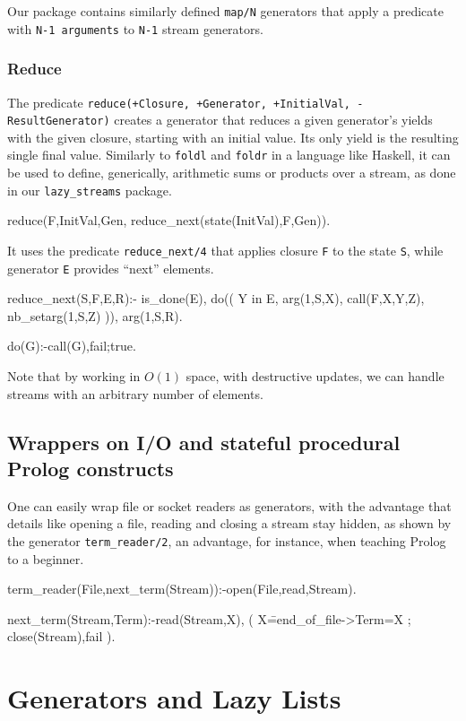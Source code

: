 \documentclass{new_tlp}
\begin{document}
Our package contains similarly defined {\tt map/N} generators that
apply a predicate with {\tt N-1 arguments} to
{\tt N-1} stream generators.

\subsubsection{Reduce}

The predicate {\tt reduce(+Closure, +Generator, +InitialVal, -ResultGenerator)}
creates a generator that reduces a given generator's yields with the given closure, 
starting with an initial value. Its only yield is the resulting single final value.
Similarly to {\tt foldl} and {\tt foldr} in a language like Haskell, it can be used to
define, generically, arithmetic sums or products over a stream,
as done in our {\tt lazy\_streams} package.

\begin{code}
reduce(F,InitVal,Gen, reduce_next(state(InitVal),F,Gen)).
\end{code}
It uses the predicate {\tt reduce\_next/4} 
that  applies closure {\tt F} to the state {\tt S}, 
while generator {\tt E} provides ``next'' elements.
\begin{code}
reduce_next(S,F,E,R):- \+ is_done(E),
  do((
    Y in E, arg(1,S,X),
    call(F,X,Y,Z),
    nb_setarg(1,S,Z)
  )),
  arg(1,S,R).

do(G):-call(G),fail;true.
\end{code}
Note that by working in $O(1)$ space, with destructive updates,
we can handle streams with an arbitrary number of elements.
\subsection{Wrappers on I/O and stateful procedural Prolog constructs}

One can easily wrap file or socket readers as generators, with the
advantage that details like opening a file, reading and
closing a stream stay hidden,  as shown by the generator
{\tt term\_reader/2}, an advantage, for instance, 
when teaching Prolog to a beginner.

\begin{code}
term_reader(File,next_term(Stream)):-open(File,read,Stream).

next_term(Stream,Term):-read(Stream,X),
  ( X\==end_of_file->Term=X
  ; close(Stream),fail
  ).
\end{code}


\section{Generators and Lazy Lists}\label{ll}
\end{document}
